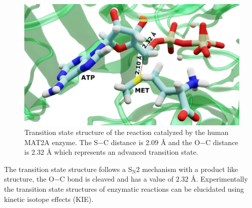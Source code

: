 \documentclass[journal=jpcbfk,manuscript=article,layout=traditional]{achemso}
\begin{document}
\begin{figure}[ht!]
\includegraphics[scale=0.12]{blender-images/ada/mat2a-trans-labelled.png}
\caption{Transition state structure of the reaction catalyzed by the human MAT2A enzyme.
The S$-$C distance is $2.09$ {\AA} and the O$-$C distance is $2.32$ {\AA} which represents 
an advanced transition state.}
\label{fig:mat2a-trans-struct}
\end{figure}
The transition state structure follows a S$_{\text{N}}2$ 
mechanism with a product like structure, the O$-$C bond is cleaved and 
has a value of $2.32$ {\AA}.
Experimentally the transition state structures of enzymatic reactions
can be elucidated using kinetic isotope effects (KIE). \cite{Schramm99MetEnzym308p301}
\end{document}
